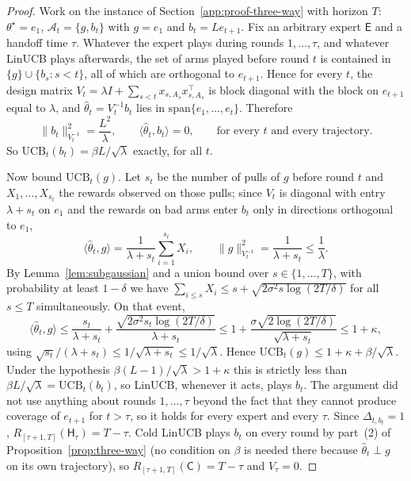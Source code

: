\documentclass{article}
\theoremstyle{definition}
\theoremstyle{remark}
\theoremstyle{remark}
\newcommand{\Cold}{\mathsf{C}}
\newcommand{\Exp}{\mathsf{E}}
\newcommand{\Hyb}{\mathsf{H}}
\begin{document}
\begin{proof}
Work on the instance of Section~\ref{app:proof-three-way} with horizon $T$:
$\theta^\star=e_1$, $\mathcal A_t=\{g,b_t\}$ with $g=e_1$ and
$b_t=Le_{t+1}$. Fix an arbitrary expert $\Exp$ and a handoff time $\tau$.
Whatever the expert plays during rounds $1,\dots,\tau$, and whatever LinUCB
plays afterwards, the set of arms played before round $t$ is contained in
$\{g\}\cup\{b_s:s<t\}$, all of which are orthogonal to $e_{t+1}$. Hence for
every $t$, the design matrix $V_t=\lambda I+\sum_{s<t}x_{s,A_s}x_{s,A_s}^\top$
is block diagonal with the block on $e_{t+1}$ equal to $\lambda$, and
$\widehat\theta_t=V_t^{-1}b_t$ lies in $\mathrm{span}\{e_1,\dots,e_t\}$. Therefore
\[
\|b_t\|_{V_t^{-1}}^2=\frac{L^2}{\lambda},\qquad \langle\widehat\theta_t,b_t\rangle=0,
\qquad\text{for every }t\text{ and every trajectory.}
\]
So $\mathrm{UCB}_t(b_t)=\beta L/\sqrt\lambda$ exactly, for all $t$.

Now bound $\mathrm{UCB}_t(g)$. Let $s_t$ be the number of pulls of $g$ before
round $t$ and $X_1,\dots,X_{s_t}$ the rewards observed on those pulls; since
$V_t$ is diagonal with entry $\lambda+s_t$ on $e_1$ and the rewards on bad
arms enter $b_t$ only in directions orthogonal to $e_1$,
\[
\langle\widehat\theta_t,g\rangle=\frac{1}{\lambda+s_t}\sum_{i=1}^{s_t}X_i,
\qquad
\|g\|_{V_t^{-1}}^2=\frac{1}{\lambda+s_t}\le\frac1\lambda .
\]
By Lemma~\ref{lem:subgaussian} and a union bound over $s\in\{1,\dots,T\}$,
with probability at least $1-\delta$ we have
$\sum_{i\le s}X_i\le s+\sqrt{2\sigma^2s\log(2T/\delta)}$ for all $s\le T$
simultaneously. On that event,
\[
\langle\widehat\theta_t,g\rangle
\le\frac{s_t}{\lambda+s_t}+\frac{\sqrt{2\sigma^2s_t\log(2T/\delta)}}{\lambda+s_t}
\le 1+\frac{\sigma\sqrt{2\log(2T/\delta)}}{\sqrt{\lambda+s_t}}
\le 1+\kappa ,
\]
using $\sqrt{s_t}/(\lambda+s_t)\le1/\sqrt{\lambda+s_t}\le1/\sqrt\lambda$.
Hence $\mathrm{UCB}_t(g)\le1+\kappa+\beta/\sqrt\lambda$. Under the hypothesis
$\beta(L-1)/\sqrt\lambda>1+\kappa$ this is strictly less than
$\beta L/\sqrt\lambda=\mathrm{UCB}_t(b_t)$, so LinUCB, whenever it acts, plays
$b_t$. The argument did not use anything about rounds $1,\dots,\tau$ beyond
the fact that they cannot produce coverage of $e_{t+1}$ for $t>\tau$, so it
holds for every expert and every $\tau$. Since $\Delta_{t,b_t}=1$,
$R_{[\tau+1,T]}(\Hyb_\tau)=T-\tau$. Cold LinUCB plays $b_t$ on every round by
part~(2) of Proposition~\ref{prop:three-way} (no condition on $\beta$ is
needed there because $\widehat\theta_t\perp g$ on its own trajectory), so
$R_{[\tau+1,T]}(\Cold)=T-\tau$ and $V_\tau=0$.
\end{proof}
\end{document}
